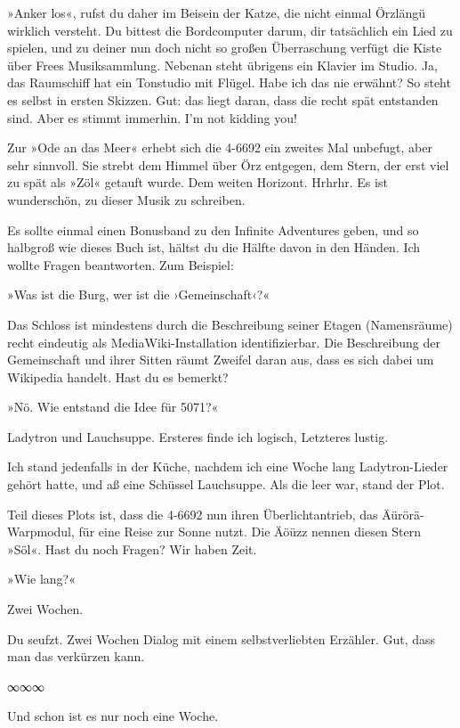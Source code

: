 »Anker los«, rufst du daher im Beisein der Katze, die nicht einmal Örzlängü wirklich versteht. Du bittest die Bordcomputer darum, dir tatsächlich ein Lied zu spielen, und zu deiner nun doch nicht so großen Überraschung verfügt die Kiste über Frees Musiksammlung. Nebenan steht übrigens ein Klavier im Studio. Ja, das Raumschiff hat ein Tonstudio mit Flügel. Habe ich das nie erwähnt? So steht es selbst in ersten Skizzen. Gut: das liegt daran, dass die recht spät entstanden sind. Aber es stimmt immerhin. I’m not kidding you!

Zur »Ode an das Meer« erhebt sich die 4-6692 ein zweites Mal unbefugt, aber sehr sinnvoll. Sie strebt dem Himmel über Örz entgegen, dem Stern, der erst viel zu spät als »Zöl« getauft wurde. Dem weiten Horizont. Hrhrhr. Es ist wunderschön, zu dieser Musik zu schreiben.

Es sollte einmal einen Bonusband zu den Infinite Adventures geben, und so halbgroß wie dieses Buch ist, hältst du die Hälfte davon in den Händen. Ich wollte Fragen beantworten. Zum Beispiel:

»Was ist die Burg, wer ist die ›Gemeinschaft‹?«

Das Schloss ist mindestens durch die Beschreibung seiner Etagen (Namensräume) recht eindeutig als MediaWiki-Installation identifizierbar. Die Beschreibung der Gemeinschaft und ihrer Sitten räumt Zweifel daran aus, dass es sich dabei um Wikipedia handelt. Hast du es bemerkt?

»Nö. Wie entstand die Idee für 5071?«

Ladytron und Lauchsuppe. Ersteres finde ich logisch, Letzteres lustig.

Ich stand jedenfalls in der Küche, nachdem ich eine Woche lang Ladytron-Lieder gehört hatte, und aß eine Schüssel Lauchsuppe. Als die leer war, stand der Plot.

Teil dieses Plots ist, dass die 4-6692 nun ihren Überlichtantrieb, das Äürörä-Warpmodul, für eine Reise zur Sonne nutzt. Die Äöüzz nennen diesen Stern »Söl«. Hast du noch Fragen? Wir haben Zeit.

»Wie lang?«

Zwei Wochen.

Du seufzt. Zwei Wochen Dialog mit einem selbstverliebten Erzähler. Gut, dass man das verkürzen kann.

\begin{center}
∞∞∞
\end{center}

Und schon ist es nur noch eine Woche.

